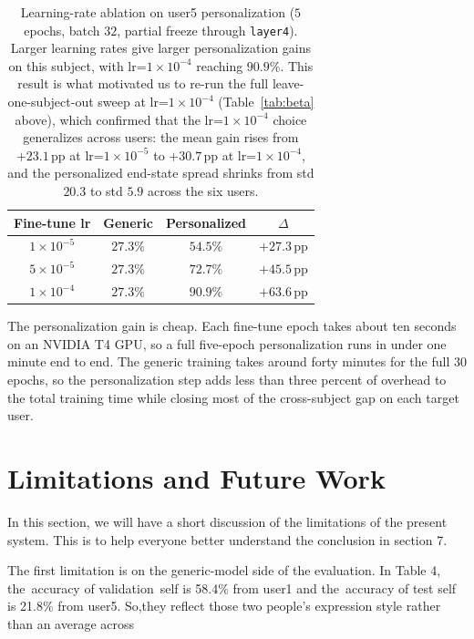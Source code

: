 \documentclass[12pt,a4paper]{article}
\begin{document}
\begin{table}[H]
  \centering
  \footnotesize
  \begin{tabular}{cccc}
    \toprule
    Fine-tune lr & Generic & Personalized & $\Delta$ \\
    \midrule
    $1\times 10^{-5}$ & $27.3\%$ & $54.5\%$           & $+27.3$\,pp \\
    $5\times 10^{-5}$ & $27.3\%$ & $72.7\%$           & $+45.5$\,pp \\
    $1\times 10^{-4}$ & $27.3\%$ & $\mathbf{90.9\%}$  & $\mathbf{+63.6}$\,pp \\
    \bottomrule
  \end{tabular}
  \caption{\footnotesize Learning-rate ablation on user5 personalization
  ($5$ epochs, batch $32$, partial freeze through
  \texttt{layer4}). Larger learning rates give larger
  personalization gains on this subject, with
  lr=$1\times 10^{-4}$ reaching $90.9\%$. This result is what
  motivated us to re-run the full leave-one-subject-out sweep
  at lr=$1\times 10^{-4}$ (Table~\ref{tab:beta} above), which
  confirmed that the lr=$1\times 10^{-4}$ choice generalizes
  across users: the mean gain rises from $+23.1$\,pp at
  lr=$1\times 10^{-5}$ to $+30.7$\,pp at lr=$1\times 10^{-4}$,
  and the personalized end-state spread shrinks from std
  $20.3$ to std $5.9$ across the six users.}
  \label{tab:ftlr}
\end{table}

The personalization gain is cheap. Each fine-tune epoch takes
about ten seconds on an NVIDIA T4 GPU, so a full five-epoch
personalization runs in under one minute end to end. The
generic training takes around forty minutes for the full $30$
epochs, so the personalization step adds less than three
percent of overhead to the total training time while closing
most of the cross-subject gap on each target user.

\section{Limitations and Future Work}
\label{sec:limits}

In this section, we will have a short discussion of the limitations of the present system. This is to help everyone better understand the conclusion in section 7. 

The first limitation is on the generic-model side of the evaluation. In Table 4, the accuracy of validation self is 58.4\% from user1 and the accuracy of test self is 21.8\% from user5. So,they reflect those two people’s expression style rather than an average across 
\end{document}
